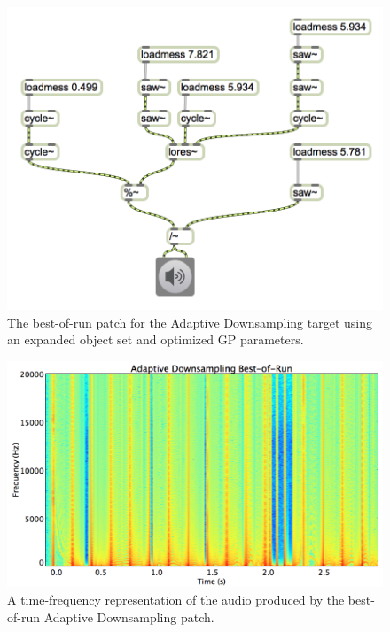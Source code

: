\documentclass[a4paper,12pt]{report} 	%
\numberwithin{figure}{chapter}
\numberwithin{table}{chapter}
\numberwithin{equation}{chapter}
\begin{document}
\begin{flushleft}
\begin{figure}[h!]
\begin{center}
\includegraphics[width=\linewidth]{AdaptiveDownsample_Best}
\caption[Adaptive Downsampling Best-of-Run Patch]{The best-of-run patch for the Adaptive Downsampling target using an expanded object set and optimized GP parameters.}
\end{center}
\end{figure}
\begin{figure}[h!]
\begin{center}
\includegraphics[scale=0.35,width=\linewidth]{AdaptiveDownsamplingBestOfRunSTFT}
\caption[Best-of-Run Adaptive Downsampling Time-Frequency Representation]{A time-frequency representation of the audio produced by the best-of-run Adaptive Downsampling patch.}
\end{center}

\end{figure}
\end{flushleft}
\end{document}
